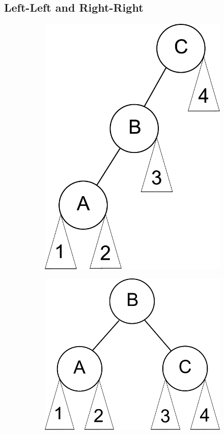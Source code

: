 \subsection*{Left-Left and Right-Right}
\begin{figure}[h]
\begin{subfigure}[b]{.49\textwidth}
    \includegraphics[width=.75\textwidth]{left_left.pdf}
\end{subfigure}
\begin{subfigure}[b]{.49\textwidth}
    \includegraphics[width=.75\textwidth]{balanced.pdf}
\end{subfigure}
\end{figure}

